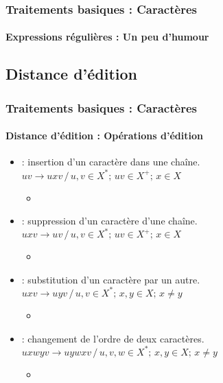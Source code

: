 \documentclass[xcolor=table]{beamer}
\begin{document}
\begin{frame}
\frametitle{Traitements basiques : Caractères}
\framesubtitle{Expressions régulières : Un peu d'humour}

\begin{center}
\end{center}

\end{frame}

\subsection{Distance d'édition}

\begin{frame}
\frametitle{Traitements basiques : Caractères}
\framesubtitle{Distance d'édition : Opérations d'édition}

\begin{itemize}
	\item {} : insertion d'un caractère dans une chaîne.\\
	$uv \rightarrow uxv \,/\, u, v \in X^*;\, uv \in X^+;\, x \in X$
	\begin{itemize}
		\item {}
	\end{itemize}
	
	\item {} : suppression d'un caractère d'une chaîne.\\
	$uxv \rightarrow uv \,/\, u, v \in X^*;\, uv \in X^+;\, x \in X$
	\begin{itemize}
		\item {}
	\end{itemize}
	
	\item {} : substitution d'un caractère par un autre.\\
	$uxv \rightarrow uyv \,/\, u, v \in X^*;\, x, y \in X;\, x \ne y$
	\begin{itemize}
		\item {}
	\end{itemize}
	
	\item {} : changement de l'ordre de deux caractères.\\
	$uxwyv \rightarrow uywxv \,/\, u, v, w \in X^*;\, x, y \in X;\, x \ne y$
	\begin{itemize}
		\item {}
	\end{itemize}
\end{itemize}

\end{frame}
\end{document}
